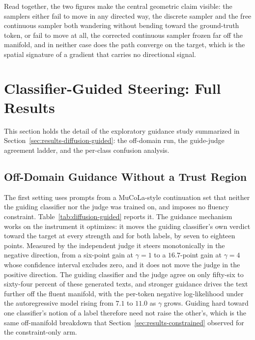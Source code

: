 Read together, the two figures make the central geometric claim visible: the samplers either fail to move in any directed way, the discrete sampler and the free continuous sampler both wandering without bending toward the ground-truth token, or fail to move at all, the corrected continuous sampler frozen far off the manifold, and in neither case does the path converge on the target, which is the spatial signature of a gradient that carries no directional signal.

\clearpage
\section{Classifier-Guided Steering: Full Results}
\label{app:guided}

This section holds the detail of the exploratory guidance study summarized in
Section~\ref{sec:results-diffusion-guided}: the off-domain run, the guide-judge agreement
ladder, and the per-class confusion analysis.

\subsection{Off-Domain Guidance Without a Trust Region}
\label{app:guided-offdomain}

The first setting uses prompts from a MuCoLa-style continuation set that neither the guiding
classifier nor the judge was trained on, and imposes no fluency constraint.
Table~\ref{tab:diffusion-guided} reports it. The guidance mechanism works on the instrument
it optimizes: it moves the guiding classifier's own verdict toward the target at every
strength and for both labels, by seven to eighteen points. Measured by the independent judge
it steers monotonically in the negative direction, from a six-point gain at $\gamma=1$ to a
$16.7$-point gain at $\gamma=4$ whose confidence interval excludes zero, and it does not move
the judge in the positive direction. The guiding classifier and the judge agree on only
fifty-six to sixty-four percent of these generated texts, and stronger guidance drives the
text further off the fluent manifold, with the per-token negative log-likelihood under the
autoregressive model rising from $7.1$ to $11.0$ as $\gamma$ grows.
Guiding hard toward one classifier's notion of a label therefore need not raise the other's,
which is the same off-manifold breakdown that Section~\ref{sec:results-constrained} observed
for the constraint-only arm.

